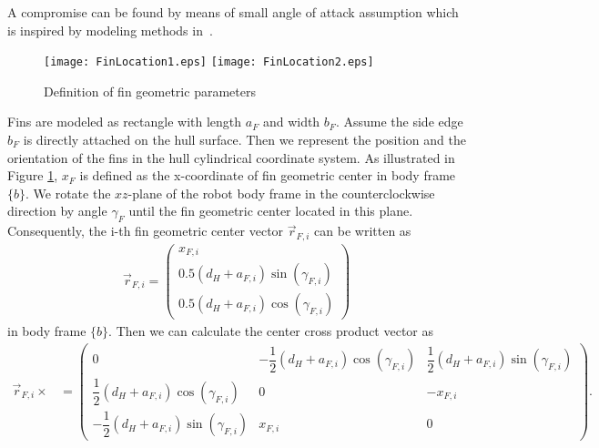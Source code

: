 A compromise can be found by means of small angle of attack assumption which is inspired by modeling methods in~\cite{FinModeling}.
\begin{figure}
\texttt{[image: FinLocation1.eps]}
\texttt{[image: FinLocation2.eps]}
\caption{Definition of fin geometric parameters}	
\label{FIG:FinLocation}
\end{figure}
Fins are modeled as rectangle with length $a_{F}$ and width $b_{F}$. Assume the side edge $b_{F}$ is directly attached on the hull surface. Then we represent the position and the orientation of the fins in the hull cylindrical coordinate system. As illustrated in Figure \ref{FIG:FinLocation}, $x_{F}$ is defined as the x-coordinate of fin geometric center in body frame $\lbrace b \rbrace$. We rotate the $xz$-plane of the robot body frame in the counterclockwise direction by angle $\gamma_{F}$ until the fin geometric center located in this plane. Consequently, the i-th fin geometric center vector $\vec{r}_{F,i}$ can be written as
\begin{align}
\vec{r}_{F,i}=
\begin{pmatrix}
x_{F,i} \\
0.5(d_{H}+a_{F,i})\sin(\gamma_{F,i}) \\
0.5(d_{H}+a_{F,i})\cos(\gamma_{F,i})
\end{pmatrix}
\end{align}
in body frame $\lbrace b \rbrace$.
Then we can calculate the center cross product vector as 
\begin{align}
 \vec{r}_{F,i}\times&=
 \begin{pmatrix}
   0&-\dfrac{1}{2}(d_{H}+a_{F,i})\cos(\gamma_{F,i})&\dfrac{1}{2}(d_{H}+a_{F,i})\sin(\gamma_{F,i})\\
   \dfrac{1}{2}(d_{H}+a_{F,i})\cos(\gamma_{F,i})&0&-x_{F,i}\\
   -\dfrac{1}{2}(d_{H}+a_{F,i})\sin(\gamma_{F,i})&x_{F,i}&0
 \end{pmatrix}.
\end{align}
